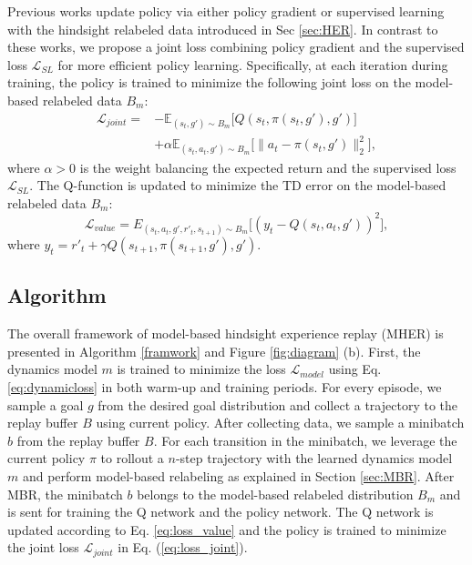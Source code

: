 \documentclass{article}
\begin{document}
Previous works update policy via either policy gradient \cite{andrychowicz2017hindsight,fang2019curriculum} or supervised learning \cite{ghosh2021learning} with the hindsight relabeled data introduced in Sec \ref{sec:HER}. In contrast to these works, we propose a joint loss combining policy gradient and the supervised loss $\mathcal{L}_{SL}$ for more efficient policy learning. Specifically, at each iteration during training, the policy is trained to minimize the following joint loss on the model-based relabeled data $B_m$:
\begin{equation}\label{eq:loss_joint}
\begin{aligned}
    \mathcal{L}_{joint} = & - \mathbb{E}_{(s_t, g') \sim B_m} \big[ Q(s_t,\pi(s_t, g'),g') \big] \\
    &+ \alpha \mathbb{E}_{(s_t,a_t,g') \sim B_m}\big[\|a_t - \pi(s_t,g')\|_2^2 \big],
\end{aligned}
\end{equation}
where $\alpha > 0$ is the weight balancing the expected return and the supervised loss $\mathcal{L}_{SL}$. The Q-function is updated to minimize the TD error on the model-based relabeled data $B_m$:
\begin{equation}
\label{eq:loss_value}
\mathcal{L}_{value}=E_{(s_t,a_t,g', r'_t,s_{t+1})\sim B_m} \big[(y_t-Q(s_t,a_t, g'))^2 \big],
\end{equation}
where $y_t = r'_t + \gamma Q (s_{t+1}, \pi (s_{t+1}, g'), g')$.



\subsection{Algorithm}
\label{sec:algorithm}
The overall framework of model-based hindsight experience replay (MHER) is presented in Algorithm \ref{framwork} and Figure \ref{fig:diagram} (b). First, the dynamics model $m$ is trained to minimize the loss $\mathcal{L}_{model}$ using Eq. \eqref{eq:dynamicloss} in both warm-up and training periods. For every episode, we sample a goal $g$ from the desired goal distribution and collect a trajectory to the replay buffer $B$ using current policy. After collecting data, we sample a minibatch $b$ from the replay buffer $B$. For each transition in the minibatch, we leverage the current policy $\pi$ to rollout a $n$-step trajectory with the learned dynamics model $m$ and perform model-based relabeling as explained in Section \ref{sec:MBR}. 
After MBR, the minibatch $b$ belongs to the model-based relabeled distribution $B_m$ and is sent for training the Q network and the policy network. The Q network is updated according to Eq. \eqref{eq:loss_value} and the policy is trained to minimize the joint loss $\mathcal{L}_{joint}$ in Eq. (\ref{eq:loss_joint}).
\end{document}
